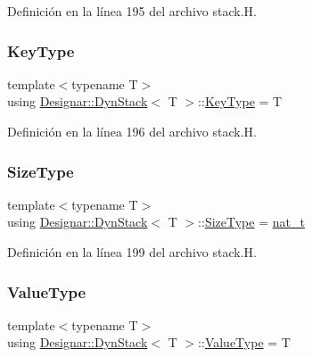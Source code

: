 Definición en la línea 195 del archivo stack.\+H.

\mbox{\label{class_designar_1_1_dyn_stack_a4a4fd39e08b25a05641fb888b99261c8}} 
\subsubsection{\texorpdfstring{Key\+Type}{KeyType}}
{\footnotesize\ttfamily template$<$typename T$>$ \\
using \hyperlink{class_designar_1_1_dyn_stack}{Designar\+::\+Dyn\+Stack}$<$ T $>$\+::\hyperlink{class_designar_1_1_fixed_array_a3a725cf21783340b8aca29dd1db0acf0}{Key\+Type} =  T}



Definición en la línea 196 del archivo stack.\+H.

\mbox{\label{class_designar_1_1_dyn_stack_adb2c839a5bc34354be458c86dd35f5b8}} 
\subsubsection{\texorpdfstring{Size\+Type}{SizeType}}
{\footnotesize\ttfamily template$<$typename T$>$ \\
using \hyperlink{class_designar_1_1_dyn_stack}{Designar\+::\+Dyn\+Stack}$<$ T $>$\+::\hyperlink{class_designar_1_1_fixed_array_a503ae414cc313d248e77c08e62ef043c}{Size\+Type} =  \hyperlink{namespace_designar_aa72662848b9f4815e7bf31a7cf3e33d1}{nat\+\_\+t}}



Definición en la línea 199 del archivo stack.\+H.

\mbox{\label{class_designar_1_1_dyn_stack_a511da1dd717eb6f9c5b143b2a8543176}} 
\subsubsection{\texorpdfstring{Value\+Type}{ValueType}}
{\footnotesize\ttfamily template$<$typename T$>$ \\
using \hyperlink{class_designar_1_1_dyn_stack}{Designar\+::\+Dyn\+Stack}$<$ T $>$\+::\hyperlink{class_designar_1_1_fixed_array_ac1cfeb4403a2dcbffd7ef494e5b873d0}{Value\+Type} =  T}



